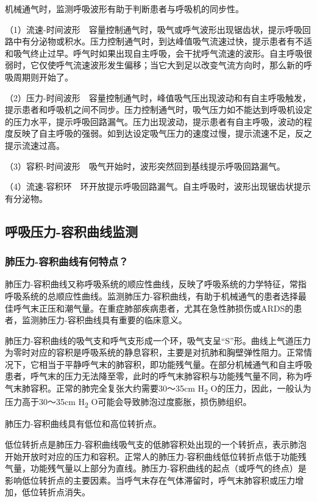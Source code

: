 机械通气时，监测呼吸波形有助于判断患者与呼吸机的同步性。

（1）流速-时间波形　容量控制通气时，吸气或呼气波形出现锯齿状，提示呼吸回路中有分泌物或积水。压力控制通气时，到达峰值吸气流速过快，提示患者有不适和吸气终止过早。呼气时如果出现自主呼吸，会干扰呼气流速的波形。自主呼吸很弱时，它仅使呼气流速波形发生偏移；当它大到足以改变气流方向时，那么新的呼吸周期则开始了。

（2）压力-时间波形　容量控制通气时，峰值吸气压出现波动和有自主呼吸触发，提示患者和呼吸机之间不同步。压力控制通气时，吸气压力如不能达到呼吸机设定的压力水平，提示呼吸回路漏气。压力出现波动，提示患者有自主呼吸，波动的程度反映了自主呼吸的强弱。如到达设定吸气压力的速度过慢，提示流速不足，反之提示流速过高。

（3）容积-时间波形　吸气开始时，波形突然回到基线提示呼吸回路漏气。

（4）流速-容积环　环开放提示呼吸回路漏气。自主呼吸时，波形出现锯齿状提示有分泌物。

\subsection{呼吸压力-容积曲线监测}

\subsubsection{肺压力-容积曲线有何特点？}

肺压力-容积曲线又称呼吸系统的顺应性曲线，反映了呼吸系统的力学特征，常指呼吸系统的总顺应性曲线。监测肺压力-容积曲线，有助于机械通气的患者选择最佳呼气末正压和潮气量。在重症肺部疾病患者，尤其在急性肺损伤或ARDS的患者，监测肺压力-容积曲线具有重要的临床意义。

肺压力-容积曲线的吸气支和呼气支形成一个环，吸气支呈“S”形。曲线上气道压力为零时对应的容积是呼吸系统的静息容积，主要是对抗肺和胸壁弹性阻力。正常情况下，它相当于平静呼气末的肺容积，即功能残气量。在部分机械通气和自主呼吸患者，呼气末的压力无法降至零，此时的呼气末肺容积与功能残气量不同，称为呼气末肺容积。正常的肺完全复张大约需要30～35cm
H\textsubscript{2} O的压力，因此，一般认为压力高于30～35cm
H\textsubscript{2} O可能会导致肺泡过度膨胀，损伤肺组织。

肺压力-容积曲线具有低位和高位转折点。

低位转折点是肺压力-容积曲线吸气支的低肺容积处出现的一个转折点，表示肺泡开始开放时对应的压力和容积。正常人的肺压力-容积曲线低位转折点低于功能残气量，功能残气量以上部分为直线。肺压力-容积曲线的起点（或呼气的终点）是影响低位转折点的主要因素。当呼气末存在气体滞留时，呼气末肺容积或压力增加，低位转折点消失。

